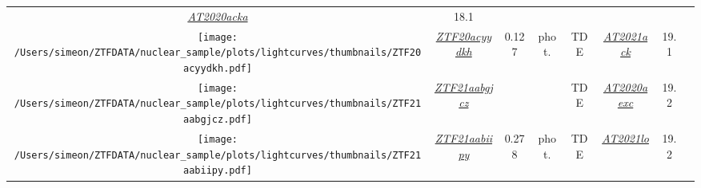 \begin{table*}
{\begin{tabular}{c c  c  c  c   c  c  c}
      \textit{\href{https://www.wis-tns.org/object/2020acka}{AT2020acka}}                                                                         & 18.1                                                                                              &                                                                                                                                   \\
      \parbox[c]{12em}{\texttt{[image: /Users/simeon/ZTFDATA/nuclear\_sample/plots/lightcurves/thumbnails/ZTF20acyydkh.pdf]}} & \textit{\href{https://ztfnuclear.simeonreusch.com/transient/ZTF20acyydkh}{ZTF20acyydkh}}          & 0.127          & phot.                   & TDE               &
      \textit{\href{https://www.wis-tns.org/object/2021ack}{AT2021ack}}                                                                           & 19.1                                                                                              &                                                                                                                                   \\
      \parbox[c]{12em}{\texttt{[image: /Users/simeon/ZTFDATA/nuclear\_sample/plots/lightcurves/thumbnails/ZTF21aabgjcz.pdf]}} & \textit{\href{https://ztfnuclear.simeonreusch.com/transient/ZTF21aabgjcz}{ZTF21aabgjcz}}          & ~              & ~                       & TDE               &
      \textit{\href{https://www.wis-tns.org/object/2020aexc}{AT2020aexc}}                                                                         & 19.2                                                                                              &                                                                                                                                   \\
      \parbox[c]{12em}{\texttt{[image: /Users/simeon/ZTFDATA/nuclear\_sample/plots/lightcurves/thumbnails/ZTF21aabiipy.pdf]}} & \textit{\href{https://ztfnuclear.simeonreusch.com/transient/ZTF21aabiipy}{ZTF21aabiipy}}          & 0.278          & phot.                   & TDE               &
      \textit{\href{https://www.wis-tns.org/object/2021lo}{AT2021lo}}                                                                             & 19.2                                                                                              &                                                                                                                                   \\

\end{tabular}}
\end{table*}
